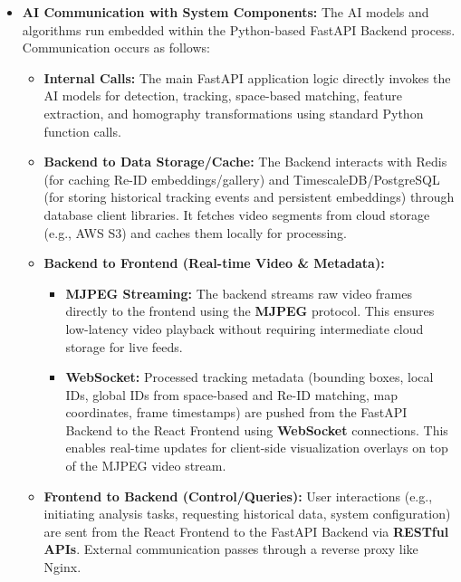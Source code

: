 \begin{itemize}
    \item \textbf{AI Communication with System Components:}
        The AI models and algorithms run embedded within the Python-based FastAPI Backend process. Communication occurs as follows:
        \begin{itemize}
            \item \textbf{Internal Calls:} The main FastAPI application logic directly invokes the AI models for detection, tracking, space-based matching, feature extraction, and homography transformations using standard Python function calls.
            \item \textbf{Backend to Data Storage/Cache:} The Backend interacts with Redis (for caching Re-ID embeddings/gallery) and TimescaleDB/PostgreSQL (for storing historical tracking events and persistent embeddings) through database client libraries. It fetches video segments from cloud storage (e.g., AWS S3) and caches them locally for processing.
            \item \textbf{Backend to Frontend (Real-time Video \& Metadata):}
                \begin{itemize}
                    \item \textbf{MJPEG Streaming:} The backend streams raw video frames directly to the frontend using the \textbf{MJPEG} protocol. This ensures low-latency video playback without requiring intermediate cloud storage for live feeds.
                    \item \textbf{WebSocket:} Processed tracking metadata (bounding boxes, local IDs, global IDs from space-based and Re-ID matching, map coordinates, frame timestamps) are pushed from the FastAPI Backend to the React Frontend using \textbf{WebSocket} connections. This enables real-time updates for client-side visualization overlays on top of the MJPEG video stream.
                \end{itemize}
            \item \textbf{Frontend to Backend (Control/Queries):} User interactions (e.g., initiating analysis tasks, requesting historical data, system configuration) are sent from the React Frontend to the FastAPI Backend via \textbf{RESTful APIs}. External communication passes through a reverse proxy like Nginx.
        \end{itemize}


\end{itemize}
